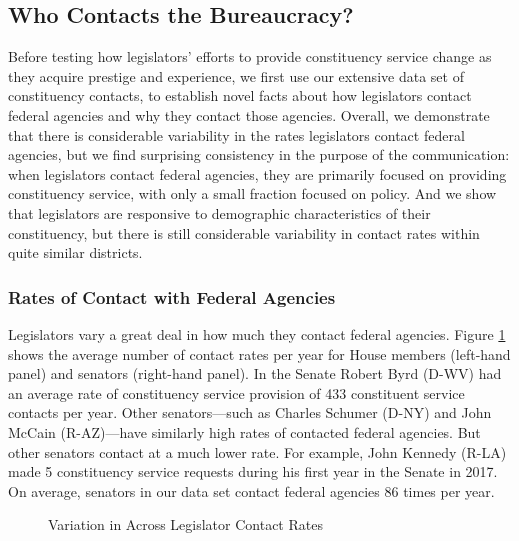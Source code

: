 \documentclass[12pt]{article}
\begin{document}
\subsection{Who Contacts the Bureaucracy?}
Before testing how legislators' efforts to provide constituency service change as they acquire prestige and experience, we first use our extensive data set of constituency contacts, to establish novel facts about how legislators contact federal agencies and why they contact those agencies.  Overall, we demonstrate that there is considerable variability in the rates legislators contact federal agencies, but we find surprising consistency in the purpose of the communication: when legislators contact federal agencies, they are primarily focused on providing constituency service, with only a small fraction focused on policy.  And we show that legislators are responsive to demographic characteristics of their constituency, but there is still considerable variability in contact rates within quite similar districts.   

\subsubsection{Rates of Contact with Federal Agencies}
Legislators vary a great deal in how much they contact federal agencies.  Figure \ref{f:contact1} shows the average number of contact rates per year for House members (left-hand panel) and senators (right-hand panel).  In the Senate Robert Byrd (D-WV) had an average rate of constituency service provision of 433 constituent service contacts per year.  Other senators---such as Charles Schumer (D-NY) and John McCain (R-AZ)---have similarly high rates of contacted federal agencies.  But other senators contact at a much lower rate.  For example, John Kennedy (R-LA) made 5 constituency service requests during his first year in the Senate in 2017.  On average, senators in our data set contact federal agencies 86 times per year.    
 
\begin{figure}
\centering
\caption{Variation in Across Legislator Contact Rates} \label{f:contact1} 
\begin{minipage}{\textwidth}
\end{minipage}
\end{figure}
\end{document}

